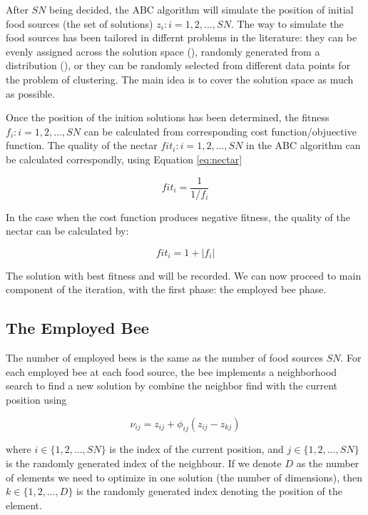 \documentclass[]{article}
\begin{document}
After \(SN\) being decided, the ABC algorithm will simulate the position of initial food sources (the set of solutions) \(z_i:i=1,2,\ldots,SN\). The way to simulate the food sources has been tailored in differnt problems in the literature: they can be evenly assigned across the solution space (\textcite{ABCoptim}), randomly generated from a distribution (\textcite{karaboga2011novel}), or they can be randomly selected from different data points for the problem of clustering. The main idea is to cover the solution space as much as possible.

Once the position of the inition solutions has been determined, the fitness \(f_i:i = 1,2,\ldots,SN\) can be calculated from corresponding cost function/objuective function. The quality of the nectar \(fit_i:i=1,2,\ldots,SN\) in the ABC algorithm can be calculated correspondly, using Equation \eqref{eq:nectar}

\begin{equation}
\label{eq:nectar}
fit_i = \frac{1}{1/f_i}
\end{equation}

In the case when the cost function produces negative fitness, the quality of the nectar can be calculated by:

\begin{equation}
\label{eq:nectar-neg}
fit_i = 1+|f_i|
\end{equation}

The solution with best fitness and will be recorded. We can now proceed to main component of the iteration, with the first phase: the employed bee phase.

\hypertarget{the-employed-bee}{%
\subsection{The Employed Bee}\label{the-employed-bee}}

The number of employed bees is the same as the number of food sources \(SN\). For each employed bee at each food source, the bee implements a neighborhood search to find a new solution by combine the neighbor find with the current position using

\begin{equation}
\label{eq:find-neighbor}
\nu_{ij} = z_{ij} + \phi_{ij}(z_{ij}-z_{kj})
\end{equation}

where \(i\in \{1,2,\ldots,SN\}\) is the index of the current position, and \(j\in \{1,2,\ldots,SN\}\) is the randomly generated index of the neighbour. If we denote \(D\) as the number of elements we need to optimize in one solution (the number of dimensions), then \(k\in \{1,2,\ldots,D\}\) is the randomly generated index denoting the position of the element.
\end{document}
